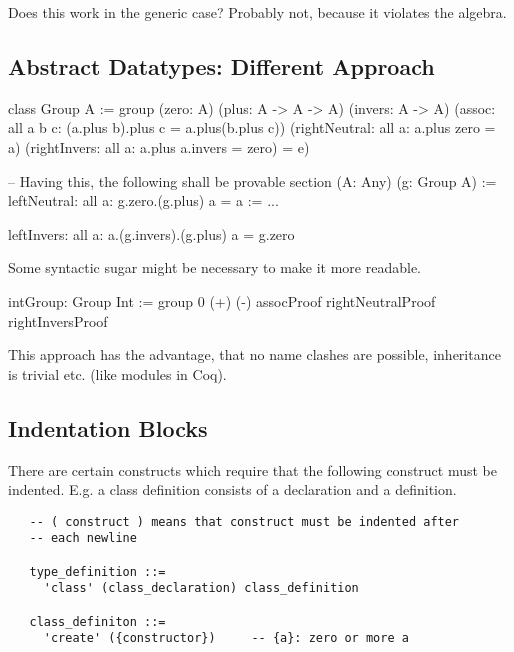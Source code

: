 Does this work in the generic case? Probably not, because it violates the
algebra.





\subsection{Abstract Datatypes: Different Approach}



\begin{alba}
    class Group A :=
        group
            (zero: A)
            (plus: A -> A -> A)
            (invers: A -> A)
            (assoc: all a b c: (a.plus b).plus c = a.plus(b.plus c))
            (rightNeutral: all a: a.plus zero = a)
            (rightInvers:  all a: a.plus a.invers = zero) = e)

    -- Having this, the following shall be provable
    section
        (A: Any)
        (g: Group A)
    :=
        leftNeutral: all a: g.zero.(g.plus) a = a := ...

        leftInvers:  all a: a.(g.invers).(g.plus) a = g.zero
\end{alba}

Some syntactic sugar might be necessary to make it more readable.



\begin{alba}
    intGroup: Group Int :=
        group 0 (+) (-) assocProof rightNeutralProof rightInversProof
\end{alba}

This approach has the advantage, that no name clashes are possible, inheritance
is trivial etc. (like modules in Coq).



\begin{alba}
\end{alba}





\subsection{Indentation Blocks}

There are certain constructs which require that the following construct must
be indented. E.g. a class definition consists of a declaration and a
definition.

{\small
\begin{verbatim}
   -- ( construct ) means that construct must be indented after
   -- each newline

   type_definition ::=
     'class' (class_declaration) class_definition

   class_definiton ::=
     'create' ({constructor})     -- {a}: zero or more a
\end{verbatim}
}


